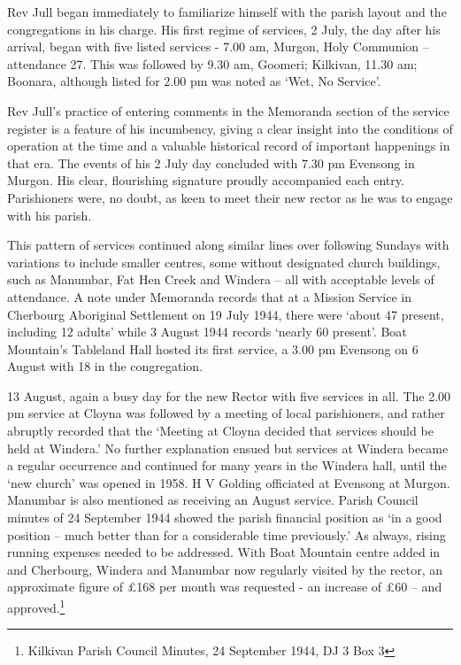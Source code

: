 Rev Jull began immediately to familiarize himself with the parish layout and the congregations in his charge. His first regime of services, 2 July, the day after his arrival, began with five listed services - 7.00 am, Murgon, Holy Communion -- attendance 27. This was followed by 9.30 am, Goomeri; Kilkivan, 11.30 am; Boonara, although listed for 2.00 pm was noted as `Wet, No Service'.

Rev Jull's practice of entering comments in the Memoranda section of the service register is a feature of his incumbency, giving a clear insight into the conditions of operation at the time and a valuable historical record of important happenings in that era. The events of his 2 July day concluded with 7.30 pm Evensong in Murgon. His clear, flourishing signature proudly accompanied each entry. Parishioners were, no doubt, as keen to meet their new rector as he was to engage with his parish.

This pattern of services continued along similar lines over following Sundays with variations to include smaller centres, some without designated church buildings, such as Manumbar, Fat Hen Creek and Windera -- all with acceptable levels of attendance. A note under Memoranda records that at a Mission Service in Cherbourg Aboriginal Settlement on 19 July 1944, there were `about 47 present, including 12 adults' while 3 August 1944 records `nearly 60 present'. Boat Mountain's Tableland Hall hosted its first service, a 3.00 pm Evensong on 6 August with 18 in the congregation.

13 August, again a busy day for the new Rector with five services in all. The 2.00 pm service at Cloyna was followed by a meeting of local parishioners, and rather abruptly recorded that the `Meeting at Cloyna decided that services should be held at Windera.' No further explanation ensued but services at Windera became a regular occurrence and continued for many years in the Windera hall, until the `new church' was opened in 1958. H V Golding officiated at Evensong at Murgon. Manumbar is also mentioned as receiving an August service. Parish Council minutes of 24 September 1944 showed the parish financial position as `in a good position -- much better than for a considerable time previously.' As always, rising running expenses needed to be addressed. With Boat Mountain centre added in and Cherbourg, Windera and Manumbar now regularly visited by the rector, an approximate figure of £168 per month was requested - an increase of £60 -- and approved.\footnote{Kilkivan Parish Council Minutes, 24 September 1944, DJ 3 Box 3}

